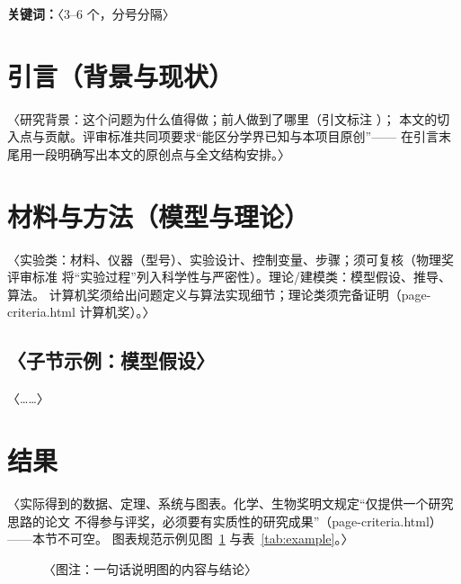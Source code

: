 \documentclass[12pt, a4paper]{article}
\begin{document}
\noindent\textbf{关键词：}〈3--6 个，分号分隔〉

\clearpage
\tableofcontents
\clearpage

\section{引言（背景与现状）}
〈研究背景：这个问题为什么值得做；前人做到了哪里（引文标注 \cite{example-ref-1}）；
本文的切入点与贡献。评审标准共同项要求“能区分学界已知与本项目原创”——
在引言末尾用一段明确写出本文的原创点与全文结构安排。〉

\section{材料与方法（模型与理论）}
〈实验类：材料、仪器（型号）、实验设计、控制变量、步骤；须可复核（物理奖评审标准
将“实验过程”列入科学性与严密性）。理论/建模类：模型假设、推导、算法。
计算机奖须给出问题定义与算法实现细节；理论类须完备证明（page-criteria.html 计算机奖）。〉

\subsection{〈子节示例：模型假设〉}
〈……〉

\section{结果}
〈实际得到的数据、定理、系统与图表。化学、生物奖明文规定“仅提供一个研究思路的论文
不得参与评奖，必须要有实质性的研究成果”（page-criteria.html）——本节不可空。
图表规范示例见图~\ref{fig:example} 与表~\ref{tab:example}。〉

\begin{figure}[htbp]
  \centering
  \caption{〈图注：一句话说明图的内容与结论〉}
  \label{fig:example}
\end{figure}
\end{document}
